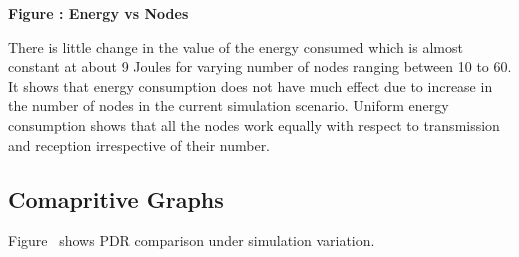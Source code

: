 \documentclass[a4paper,fleqn]{cas-dc}
\numberwithin{equation}{section}
\begin{document}
\begin{center}

\textbf{Figure \thefigure: Energy vs Nodes}
\label{fig:energy_density}
\end{center}
There is little change in the value of the energy consumed which is almost constant at about 9 Joules for varying number of nodes ranging between 10 to 60. It shows that energy consumption does not have much effect due to increase in the number of nodes in the current simulation scenario. Uniform energy consumption shows that all the nodes work equally with respect to transmission and reception irrespective of their number.

\subsection{Comapritive Graphs }



\noindent Figure \thefigure\ shows PDR comparison under simulation variation.
\end{document}

